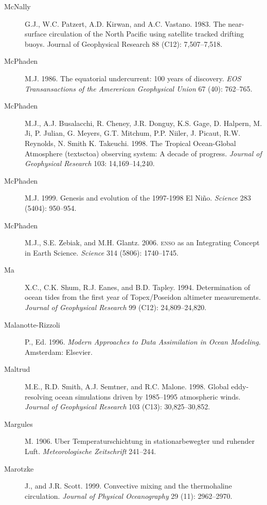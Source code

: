\begin{description}
\item [McNally]G.J., W.C. Patzert, A.D. Kirwan, and
  A.C. Vastano. 1983. The near-surface circulation of the North
  Pacific using satellite tracked drifting buoys. Journal of
  Geophysical Research 88 (C12): 7,507--7,518.

\item [McPhaden]M.J. 1986. The equatorial undercurrent: 100 years of
  discovery. \textit{EOS Transansactions of the Amererican Geophysical
    Union} 67 (40): 762--765.

\item [McPhaden]M.J., A.J. Busalacchi, R. Cheney, J.R. Donguy,
  K.S. Gage, D. Halpern, M. Ji, P. Julian, G. Meyers, G.T. Mitchum,
  P.P. Niiler, J. Picaut, R.W. Reynolds, N. Smith
  K. Takeuchi. 1998. The Tropical Ocean-Global Atmosphere
  (textsc{toa}) observing system: A decade of progress.
  \textit{Journal of Geophysical Research} 103: 14,169--14,240.
	
\item [McPhaden]M.J. 1999. Genesis and evolution of the 1997-1998 El
  Ni\~{n}o. \textit{Science} 283 (5404): 950--954.

\item [McPhaden]M.J., S.E. Zebiak, and
  M.H. Glantz. 2006. \textsc{enso} as an Integrating Concept in Earth
  Science. \textit{Science} 314 (5806): 1740--1745.

\item [Ma]X.C., C.K. Shum, R.J. Eanes, and
  B.D. Tapley. 1994. Determination of ocean tides from the first year
  of Topex/Poseidon altimeter measurements. \textit{Journal of
    Geophysical Research} 99 (C12): 24,809--24,820.

\item [Malanotte-Rizzoli]P., Ed. 1996. \textit{Modern Approaches to
  Data Assimilation in Ocean Modeling}. Amsterdam: Elsevier.

\item [Maltrud]M.E., R.D. Smith, A.J. Semtner, and
  R.C. Malone. 1998. Global eddy-resolving ocean simulations driven by
  1985--1995 atmospheric winds.  \textit{Journal of Geophysical
    Research} 103 (C13): 30,825--30,852.

\item [Margules]M. 1906. Uber Temperaturschichtung in
  stationarbewegter und ruhender Luft. \textit{Meteorologische
    Zeitschrift} 241--244.

\item [Marotzke]J., and J.R. Scott. 1999. Convective mixing and the
  thermohaline circulation. \textit{Journal of Physical Oceanography}
  29 (11): 2962--2970.


\end{description}
